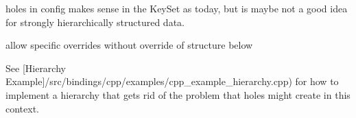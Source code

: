 holes in config makes sense in the Key\+Set as today, but is maybe not a good idea for strongly hierarchically structured data.


\begin{DoxyItemize}
\item allow specific overrides without override of structure below
\end{DoxyItemize}

See \mbox{[}Hierarchy Example\mbox{]}/src/bindings/cpp/examples/cpp\+\_\+example\+\_\+hierarchy.cpp) for how to implement a hierarchy that gets rid of the problem that holes might create in this context. 